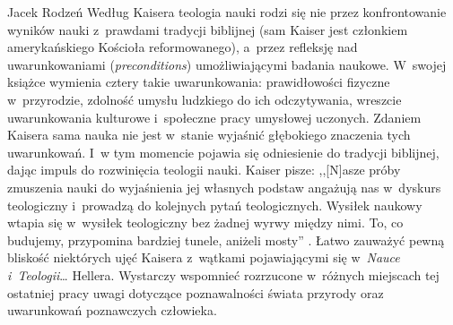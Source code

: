 \begin{newrevplenv}{Jacek Rodzeń}
Według Kaisera teologia nauki rodzi się nie przez konfrontowanie wyników nauki z~prawdami tradycji biblijnej (sam Kaiser jest członkiem amerykańskiego Kościoła reformowanego), a~przez refleksję nad uwarunkowaniami (\textit{preconditions}) umożliwiającymi badania naukowe. W~swojej książce wymienia cztery takie uwarunkowania: prawidłowości fizyczne w~przyrodzie, zdolność umysłu ludzkiego do ich odczytywania, wreszcie uwarunkowania kulturowe i~społeczne pracy umysłowej uczonych. Zdaniem Kaisera sama nauka nie jest w~stanie wyjaśnić głębokiego znaczenia tych uwarunkowań. I~w tym momencie pojawia się odniesienie do tradycji biblijnej, dając impuls do rozwinięcia teologii nauki. Kaiser pisze: ,,[N]asze próby zmuszenia nauki do wyjaśnienia jej własnych podstaw angażują nas w~dyskurs teologiczny i~prowadzą do kolejnych pytań teologicznych. Wysiłek naukowy wtapia się w~wysiłek teologiczny bez żadnej wyrwy między nimi. To, co budujemy, przypomina bardziej tunele, aniżeli mosty''
\parencite[][s.~124]{kaiser_toward_2007}. %
 Łatwo zauważyć pewną bliskość niektórych ujęć Kaisera z~wątkami pojawiającymi się w~\textit{Nauce i~Teologii}… Hellera. Wystarczy wspomnieć rozrzucone w~różnych miejscach tej ostatniej pracy uwagi dotyczące poznawalności świata przyrody oraz uwarunkowań poznawczych człowieka.


\end{newrevplenv}
